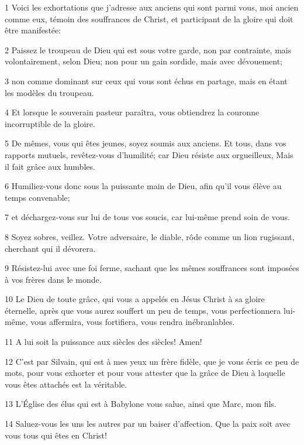 \par 1 Voici les exhortations que j'adresse aux anciens qui sont parmi vous, moi ancien comme eux, témoin des souffrances de Christ, et participant de la gloire qui doit être manifestée:
\par 2 Paissez le troupeau de Dieu qui est sous votre garde, non par contrainte, mais volontairement, selon Dieu; non pour un gain sordide, mais avec dévouement;
\par 3 non comme dominant sur ceux qui vous sont échus en partage, mais en étant les modèles du troupeau.
\par 4 Et lorsque le souverain pasteur paraîtra, vous obtiendrez la couronne incorruptible de la gloire.
\par 5 De mêmes, vous qui êtes jeunes, soyez soumis aux anciens. Et tous, dans vos rapports mutuels, revêtez-vous d'humilité; car Dieu résiste aux orgueilleux, Mais il fait grâce aux humbles.
\par 6 Humiliez-vous donc sous la puissante main de Dieu, afin qu'il vous élève au temps convenable;
\par 7 et déchargez-vous sur lui de tous vos soucis, car lui-même prend soin de vous.
\par 8 Soyez sobres, veillez. Votre adversaire, le diable, rôde comme un lion rugissant, cherchant qui il dévorera.
\par 9 Résistez-lui avec une foi ferme, sachant que les mêmes souffrances sont imposées à vos frères dans le monde.
\par 10 Le Dieu de toute grâce, qui vous a appelés en Jésus Christ à sa gloire éternelle, après que vous aurez souffert un peu de temps, vous perfectionnera lui-même, vous affermira, vous fortifiera, vous rendra inébranlables.
\par 11 A lui soit la puissance aux siècles des siècles! Amen!
\par 12 C'est par Silvain, qui est à mes yeux un frère fidèle, que je vous écris ce peu de mots, pour vous exhorter et pour vous attester que la grâce de Dieu à laquelle vous êtes attachés est la véritable.
\par 13 L'Église des élus qui est à Babylone vous salue, ainsi que Marc, mon fils.
\par 14 Saluez-vous les uns les autres par un baiser d'affection. Que la paix soit avec vous tous qui êtes en Christ!


